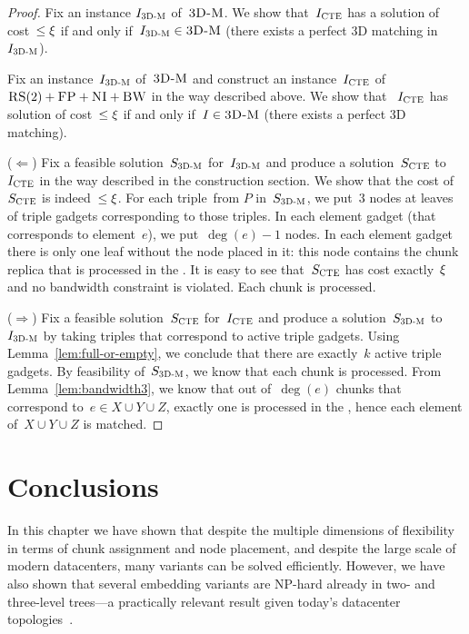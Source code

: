 \begin{proof}
  Fix an instance $I_{\mathrm{\textsc{3D-M}}}$ of~$\textsc{3D-M}$.
  We show that~$I_{\mathrm{\textsc{CTE}}}$ has a solution of cost~$\leq \xi$ if and only if~$I_{\mathrm{\textsc{3D-M}}} \in \textsc{3D-M}$ (there exists a perfect 3D matching in $I_{\mathrm{\textsc{3D-M}}}$).


  Fix an instance~$I_{\mathrm{\textsc{3D-M}}}$ of~$\textsc{3D-M}$ and construct an instance~$I_{\mathrm{\textsc{CTE}}}$
  of~$\textsc{RS}(2)+\textsc{FP}+\textsc{NI}+\textsc{BW}$ in the way described above.  We show that
 ~$I_{\mathrm{\textsc{CTE}}}$ has solution of cost~$\leq \xi$ if and only if~$I \in \textsc{3D-M}$
  (there exists a perfect 3D matching).

  ($\Leftarrow$) Fix a feasible solution~$S_{\mathrm{\textsc{3D-M}}}$ for~$I_{\mathrm{\textsc{3D-M}}}$ and
  produce a solution~$S_{\mathrm{\textsc{CTE}}}$ to~$I_{\mathrm{\textsc{CTE}}}$ in the way described in the construction section. We show that the cost of~$S_{\mathrm{\textsc{CTE}}}$ is
  indeed~$\leq \xi$.
  For each triple~from $P$ in~$S_{\mathrm{\textsc{3D-M}}}$, we put~$3$ nodes at
  leaves of triple gadgets corresponding to those triples.  In each
  element gadget (that corresponds to element~$e$), we put~$\deg(e)-1$
  nodes. In each element gadget there is only one leaf without the
  node placed in it: this node contains the chunk replica that is
  processed in the {\MatchSubtree}.
  It is easy to see that~$S_{\mathrm{\textsc{CTE}}}$ has cost exactly~$\xi$ and no
  bandwidth constraint is violated. Each chunk is processed.

  ($\Rightarrow$) Fix a feasible solution~$S_{\mathrm{\textsc{CTE}}}$ for~$I_{\mathrm{\textsc{CTE}}}$ and
  produce a solution~$S_{\mathrm{\textsc{3D-M}}}$ to~$I_{\mathrm{\textsc{3D-M}}}$ by taking triples that correspond
  to active triple gadgets. Using Lemma~\ref{lem:full-or-empty}, we
  conclude that there are exactly~$k$ active triple gadgets. By
  feasibility of~$S_{\mathrm{\textsc{3D-M}}}$, we know that each chunk is
  processed. From Lemma~\ref{lem:bandwidth3}, we know that out
  of~$\deg(e)$ chunks that correspond to~$e\in X\cup Y\cup Z$,
  exactly one is processed in the {\MatchSubtree}, hence each
  element of~$X\cup Y\cup Z$ is matched.
\end{proof}


\section{Conclusions}\label{sec:conclusion-static}


In this chapter we have shown that despite the
multiple dimensions of flexibility in terms of chunk assignment and node placement, 
and despite the large scale of modern datacenters, 
many variants can be solved efficiently. However, we have also
shown that several embedding variants are NP-hard already in two-
and three-level trees---a practically relevant result given today's datacenter topologies~\cite{fattree}.


